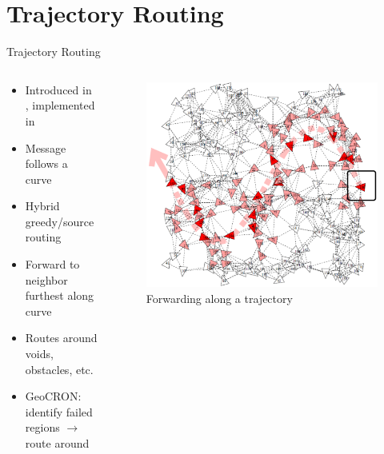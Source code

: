 \documentclass[pdftex]{beamer}
\begin{document}

\section{Trajectory Routing}

\begin{frame}{Trajectory Routing}
\begin{columns}
\begin{column}{.5\textwidth}
	\begin{itemize}
		\item Introduced in \cite{Niculescu2003, Niculescu2004}, implemented in \cite{Yuksel2006}
		\item Message follows a curve
		\item Hybrid greedy/source routing
		\item Forward to neighbor furthest along curve
		\item Routes around voids, obstacles, etc.
		\item GeoCRON: identify failed regions $\rightarrow$ route around
	\end{itemize}
\end{column}
	
\begin{column}{.5\textwidth}
\begin{figure}
\includegraphics[width=\textwidth]{trajectory}
\caption{Forwarding along a trajectory}
\end{figure}
\end{column}
\end{columns}
\end{frame}
\end{document}
